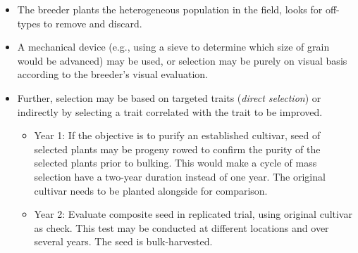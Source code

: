 \documentclass[11pt,ignorenonframetext,aspectratio=169]{beamer}
\providecommand{\tightlist}{%
  \setlength{\itemsep}{0pt}\setlength{\parskip}{0pt}}
\begin{document}
\begin{frame}{}
\protect\hypertarget{section-6}{}
\begin{itemize}
\tightlist
\item
  The breeder plants the heterogeneous population in the field, looks
  for off-types to remove and discard.
\item
  A mechanical device (e.g., using a sieve to determine which size of
  grain would be advanced) may be used, or selection may be purely on
  visual basis according to the breeder's visual evaluation.
\item
  Further, selection may be based on targeted traits (\emph{direct
  selection}) or indirectly by selecting a trait correlated with the
  trait to be improved.

  \begin{itemize}
  \tightlist
  \item
    Year 1: If the objective is to purify an established cultivar, seed
    of selected plants may be progeny rowed to confirm the purity of the
    selected plants prior to bulking. This would make a cycle of mass
    selection have a two-year duration instead of one year. The original
    cultivar needs to be planted alongside for comparison.
  \item
    Year 2: Evaluate composite seed in replicated trial, using original
    cultivar as check. This test may be conducted at different locations
    and over several years. The seed is bulk-harvested.
  \end{itemize}
\end{itemize}
\end{frame}
\end{document}
